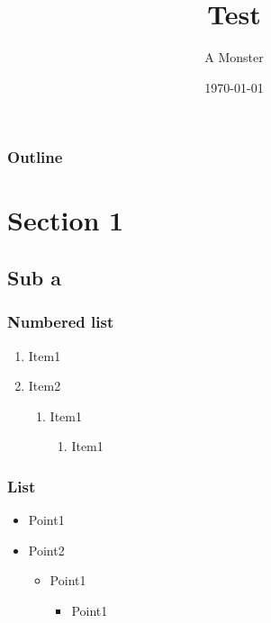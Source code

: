 \documentclass[xcolor=dvipsnames]{beamer}
\title{Test}
\author{A Monster}
\institute{In A Cave}
\date{\today}
\begin{document}
\begin{frame}
\titlepage
\end{frame}

\begin{frame}
\frametitle{Outline}
\tableofcontents
\end{frame}

\section{Section 1}
\subsection{Sub a}

\begin{frame}
\frametitle{Numbered list}
\begin{enumerate}
  \item Item1
  \item Item2
  \begin{enumerate}
    \item Item1
    \begin{enumerate}
      \item Item1
    \end{enumerate}
  \end{enumerate}
\end{enumerate}
\end{frame}

\begin{frame}
\frametitle{List}
\begin{itemize}
  \item Point1
  \item Point2
  \begin{itemize}
    \item Point1
    \begin{itemize}
      \item Point1
    \end{itemize}
  \end{itemize}
\end{itemize}
\end{frame}
\end{document}
